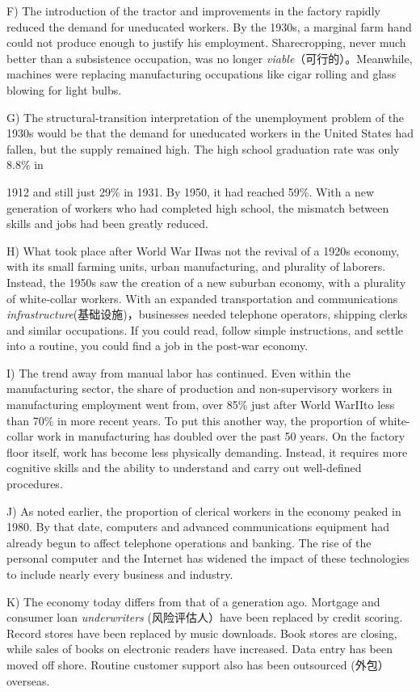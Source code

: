 \documentclass[UTF8,11pt]{ctexart}
\begin{document}
F) The introduction of the tractor and improvements in the factory rapidly reduced the demand for uneducated workers. By the 1930s, a marginal farm hand could not produce enough to justify his employment. Sharecropping, never much better than a subsistence occupation, was no longer\textit{ viable}（可行的）。Meanwhile, machines were replacing manufacturing occupations like cigar rolling and glass blowing for light bulbs.


G) The structural-transition interpretation of the unemployment problem of the 1930s would be that the demand for uneducated workers in the United States had fallen, but the supply remained high. The high school graduation rate was only 8.8\% in


1912 and still just 29\% in 1931. By 1950, it had reached 59\%. With a new generation of workers who had completed high school, the mismatch between skills and jobs had been greatly reduced.


H) What took place after World War IIwas not the revival of a 1920s economy, with its small farming units, urban manufacturing, and plurality of laborers. Instead, the 1950s saw the creation of a new suburban economy, with a plurality of white-collar workers. With an expanded transportation and communications\textit{ infrastructure}(基础设施)，businesses needed telephone operators, shipping clerks and similar occupations. If you could read, follow simple instructions, and settle into a routine, you could find a job in the post-war economy.


I) The trend away from manual labor has continued. Even within the manufacturing sector, the share of production and non-supervisory workers in manufacturing employment went from, over 85\% just after World WarIIto less than 70\% in more recent years. To put this another way, the proportion of white- collar work in manufacturing has doubled over the past 50 years. On the factory floor itself, work has become less physically demanding. Instead, it requires more cognitive skills and the ability to understand and carry out well-defined procedures.


J) As noted earlier, the proportion of clerical workers in the economy peaked in 1980. By that date, computers and advanced communications equipment had already begun to affect telephone operations and banking. The rise of the personal computer and the Internet has widened the impact of these technologies to include nearly every business and industry.


K) The economy today differs from that of a generation ago. Mortgage and consumer loan\textit{ underwriters} (风险评估人）have been replaced by credit scoring. Record stores have been replaced by music downloads. Book stores are closing, while sales of books on electronic readers have increased. Data entry has been moved off shore. Routine customer support also has been outsourced (外包）overseas.
\end{document}
